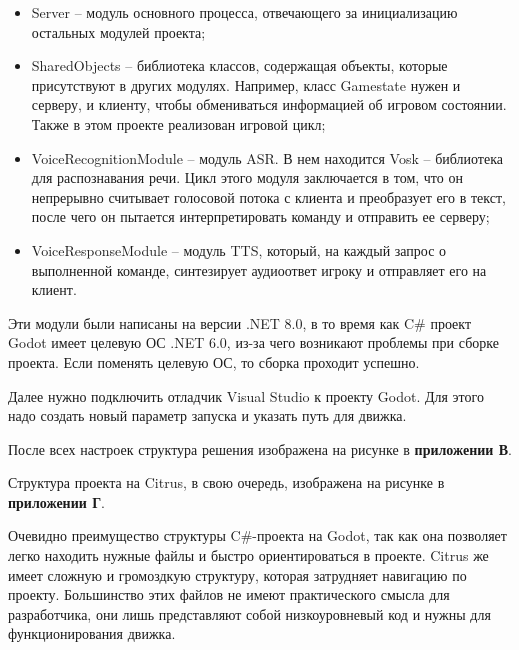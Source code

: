         \begin{itemize}
            \item Server -- модуль основного процесса, отвечающего за инициализацию остальных модулей проекта;
            \item SharedObjects -- библиотека классов, содержащая объекты, которые присутствуют в других модулях. Например, класс Gamestate нужен и серверу, и клиенту, чтобы обмениваться информацией об игровом состоянии. Также в этом проекте реализован игровой цикл;
            \item VoiceRecognitionModule -- модуль ASR. В нем находится Vosk -- библиотека для распознавания речи. Цикл этого модуля заключается в том, что он непрерывно считывает голосовой потока с клиента и преобразует его в текст, после чего он пытается интерпретировать команду и отправить ее серверу;
            \item VoiceResponseModule -- модуль TTS, который, на каждый запрос о выполненной команде, синтезирует аудиоответ игроку и отправляет его на клиент.
        \end{itemize}

        Эти модули были написаны на версии .NET 8.0, в то время как C\# проект Godot имеет целевую ОС .NET 6.0, из-за чего возникают проблемы при сборке проекта. Если поменять целевую ОС, то сборка проходит успешно.

        Далее нужно подключить отладчик Visual Studio к проекту Godot. Для этого надо создать новый параметр запуска и указать путь для движка.
        
        После всех настроек структура решения изображена на рисунке в \textbf{приложении В}.

        Структура проекта на Citrus, в свою очередь, изображена на рисунке в \textbf{приложении Г}.

        Очевидно преимущество структуры C\#-проекта на Godot, так как она позволяет легко находить нужные файлы и быстро ориентироваться в проекте. Citrus же имеет сложную и громоздкую структуру, которая затрудняет навигацию по проекту. Большинство этих файлов не имеют практического смысла для разработчика, они лишь представляют собой низкоуровневый код и нужны для функционирования движка. 

